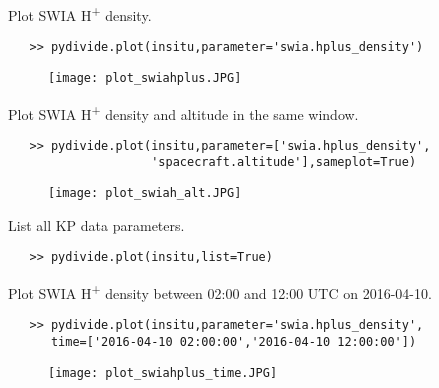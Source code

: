 \documentclass{article}
\begin{document}
\indent Plot SWIA H\textsuperscript{+} density.\\
\vspace{-10mm}
\begin{verbatim}
   >> pydivide.plot(insitu,parameter='swia.hplus_density')
\end{verbatim}
\begin{figure}[H]
\centering
\texttt{[image: plot\_swiahplus.JPG]}
\end{figure}
\noindent \indent Plot SWIA H\textsuperscript{+} density and altitude in the same window.\\
\vspace{-10mm}
\begin{verbatim}
   >> pydivide.plot(insitu,parameter=['swia.hplus_density',
                    'spacecraft.altitude'],sameplot=True)
\end{verbatim}
\begin{figure}[H]
\centering
\texttt{[image: plot\_swiah\_alt.JPG]}
\end{figure}
\noindent \indent List all KP data parameters.\\
\vspace{-10mm}
\begin{verbatim}
   >> pydivide.plot(insitu,list=True)
\end{verbatim}
\noindent \indent Plot SWIA H\textsuperscript{+} density between 02:00 and 12:00 UTC on 2016-04-10.
\vspace{-5mm}
\begin{verbatim}
   >> pydivide.plot(insitu,parameter='swia.hplus_density',
      time=['2016-04-10 02:00:00','2016-04-10 12:00:00'])
\end{verbatim}
\begin{figure}[H]
\centering
\texttt{[image: plot\_swiahplus\_time.JPG]}
\end{figure}




\newpage
\end{document}
